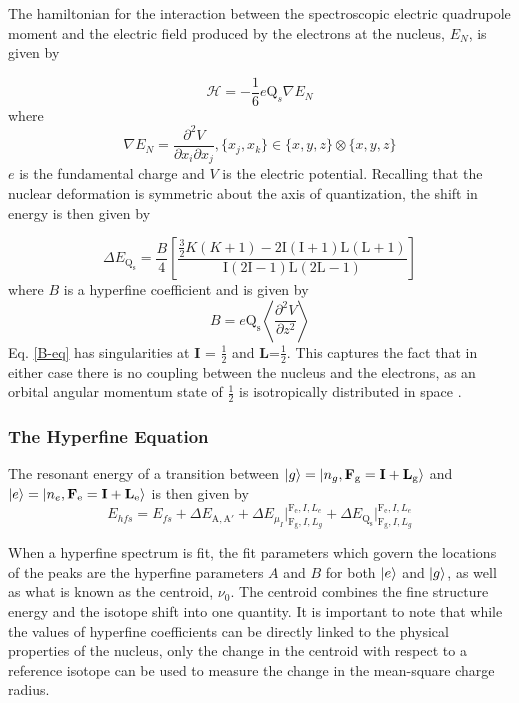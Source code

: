 \documentclass[12pt,a4paper,margin=1in]{report}
\begin{document}
The hamiltonian for the interaction between the spectroscopic electric quadrupole moment and the electric field produced by the electrons at the nucleus, $E_N$, is given by

\begin{equation}
\mathcal{H} = - \frac{1}{6}e\mathrm{Q}_s\nabla{E_N}
\end{equation}
where
\begin{equation}
\nabla{E_N} = \frac{\partial^2V}{\partial x_i\partial x_j}, \{x_j,x_k\} \in \{x,y,z\} \otimes \{x,y,z\}
\end{equation}
$e$ is the fundamental charge and $V$ is the electric potential. Recalling that the nuclear deformation is symmetric about the axis of quantization, the shift in energy is then given by

\begin{equation}
\Delta E_{\mathrm{Q_s}} = \frac{B}{4}\left[\frac{\frac{3}{2}K(K+1)-2\mathrm{I}(\mathrm{I}+1)\mathrm{L}(\mathrm{L}+1)}{\mathrm{I}(2\mathrm{I}-1)\mathrm{L}(2\mathrm{L}-1)}\right]
\label{B-eq}
\end{equation}
where $B$ is a hyperfine coefficient and is given by
\begin{equation}
B = e\mathrm{Q_s}\left\langle\frac{\partial^2V}{\partial z^2} \right\rangle
\end{equation}
Eq. \ref{B-eq} has singularities at \textbf{I} = $\frac{1}{2}$ and \textbf{L}=$\frac{1}{2}$. This captures the fact that in either case there is no coupling between the nucleus and the electrons, as an orbital angular momentum state of $\frac{1}{2}$ is isotropically distributed in space .

\subsubsection*{The Hyperfine Equation}
The resonant energy of a transition between $\ket{g}=\ket{n_g,\mathrm{\textbf{F}_g=\textbf{I} + \textbf{L}_g}}$ and $\ket{e}=\ket{n_e,\mathrm{\textbf{F}_e=\textbf{I} + \textbf{L}_e}}$ is then given by
\begin{equation}
E_{hfs} = E_{fs} +  \Delta E_{\mathrm{A,A'}}+\Delta E_{\mu_I}\Bigr|_{\mathrm{F_g},I,L_g}^{\mathrm{F_e},I,L_e}+\Delta E_{\mathrm{Q_s}}\Bigr|_{\mathrm{F_g},I,L_g}^{\mathrm{F_e},I,L_e}
\end{equation}

When a hyperfine spectrum is fit, the fit parameters which govern the locations of the peaks are the hyperfine parameters $A$ and $B$ for both $\ket{e}$ and $\ket{g}$, as well as what is known as the centroid, $\nu_0$. The centroid combines the fine structure energy and the isotope shift into one quantity. It is important to note that while the values of hyperfine coefficients can be directly linked to the physical properties of the nucleus, only the change in the centroid with respect to a reference isotope can be used to measure the change in the mean-square charge radius.
\end{document}
